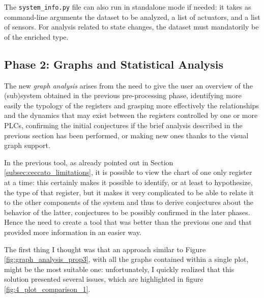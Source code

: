 \bigskip
The \texttt{system\_info.py} file can also run in standalone mode if needed: it takes as command-line arguments the dataset to be analyzed, a list of actuators, and a list of sensors. For analysis related to state changes, the dataset must mandatorily be of the enriched type.

\subsection{Phase 2: Graphs and Statistical Analysis}
\label{subsec:4_improve_graphs}

The new \textit{graph analysis} arises from the need to give the user an overview of the (sub)system obtained in the previous pre-processing phase, identifying more easily the typology of the registers and grasping more effectively the relationships and the dynamics that may exist between the registers controlled by one or more PLCs, confirming the initial conjectures if the brief analysis described in the previous section has been performed, or making new ones thanks to the visual graph support. 

\bigskip
In the previous tool, as already pointed out in Section \ref{subsec:ceccato_limitations}, it is possible to view the chart of one only register at a time: this certainly makes it possible to identify, or at least to hypothesize, the type of that register, but it makes it very complicated to be able to relate it to the other components of the system and thus to derive conjectures about the behavior of the latter, conjectures to be possibly confirmed in the later phases. Hence the need to create a tool that was better than the previous one and that provided more information in an easier way.

\bigskip
The first thing I thought was that an approach similar to Figure \ref{fig:graph_analysis_prop3}, with all the graphs contained within a single plot, might be the most suitable one: unfortunately, I quickly realized that this solution presented several issues, which are highlighted in figure \ref{fig:4_plot_comparison_1}. 

